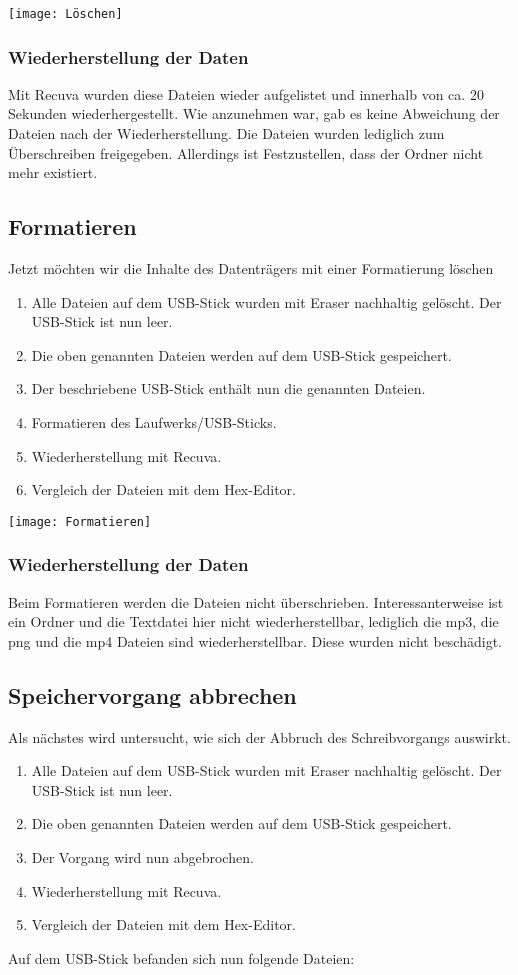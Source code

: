 \documentclass[10pt,a4paper]{article} %
\begin{document}
\texttt{[image: Löschen]}


\subsubsection{Wiederherstellung der Daten}
Mit Recuva wurden diese Dateien wieder aufgelistet und innerhalb von ca. 20 Sekunden wiederhergestellt. Wie anzunehmen war, gab es keine Abweichung der Dateien nach der Wiederherstellung. Die Dateien wurden lediglich zum Überschreiben freigegeben. Allerdings ist Festzustellen, dass der Ordner nicht mehr existiert.


\newpage
\subsection{Formatieren} %
Jetzt möchten wir die Inhalte des Datenträgers mit einer Formatierung löschen
\begin{enumerate}
\item Alle Dateien auf dem USB-Stick wurden mit Eraser nachhaltig gelöscht. Der USB-Stick ist nun \glqq leer\grqq{}.
\item Die oben genannten Dateien werden auf dem USB-Stick gespeichert.
\item Der beschriebene USB-Stick enthält nun die genannten Dateien.
\item Formatieren des Laufwerks/USB-Sticks.
\item Wiederherstellung mit Recuva.
\item Vergleich der Dateien mit dem Hex-Editor.
\end{enumerate}

\texttt{[image: Formatieren]}

\subsubsection{Wiederherstellung der Daten}
Beim Formatieren werden die Dateien nicht überschrieben. Interessanterweise ist ein Ordner und die Textdatei hier nicht wiederherstellbar, lediglich die mp3, die png und die mp4 Dateien sind wiederherstellbar. Diese wurden nicht beschädigt.

\newpage
\subsection{Speichervorgang abbrechen}
Als nächstes wird untersucht, wie sich der Abbruch des Schreibvorgangs auswirkt.
\begin{enumerate}
\item Alle Dateien auf dem USB-Stick wurden mit Eraser nachhaltig gelöscht. Der USB-Stick ist nun \glqq leer\grqq{}.
\item Die oben genannten Dateien werden auf dem USB-Stick gespeichert.
\item Der Vorgang wird nun abgebrochen.
\item Wiederherstellung mit Recuva.
\item Vergleich der Dateien mit dem Hex-Editor.
\end{enumerate}
Auf dem USB-Stick befanden sich nun folgende Dateien:
\end{document}

